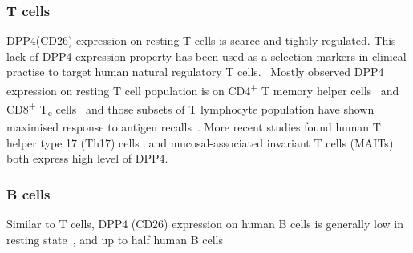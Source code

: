 \subsubsection{T cells}
DPP4(CD26) expression on resting T cells is scarce and tightly regulated. This lack of DPP4 expression property has been used as a selection markers in clinical practise to target human natural regulatory T cells.~\cite{Salgado2012,Garcia2014} Mostly observed DPP4 expression on resting T cell population is on CD4\textsuperscript{+} T memory helper cells~\cite{Gorrell1991, Morimoto1998} and CD8\textsuperscript{+} T\textsubscript{c} cells~\cite{Waumans2015,Hatano2013} and those subsets of T lymphocyte population have shown maximised response to antigen recalls~\cite{Waumans2015,Morimoto1998,Hatano2013}. More recent studies found human T helper type 17 (Th17) cells~\cite{Bengsch2012} and mucosal-associated invariant T cells (MAITs)~\cite{Sharma2015} both express high level of DPP4.

\subsubsection{B cells}
Similar to T cells, DPP4 (CD26) expression on human B cells is generally low in resting state~\cite{B_hling_1995}, and up to half human B cells